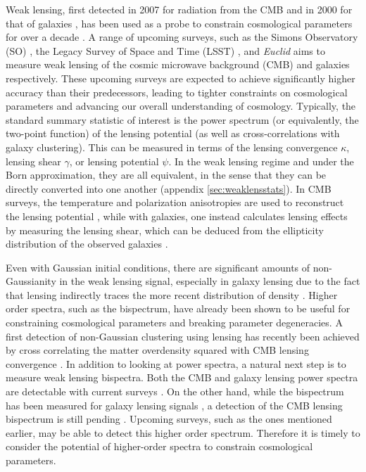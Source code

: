 \documentclass[11pt]{article} %
\begin{document}
Weak lensing, first detected in 2007 for radiation from the CMB \cite{Smith2007} and in 2000 for that of galaxies \cite{Bacon2000, Kaiser2000, Wittman_2000, vanwaerbeke2000detectioncorrelatedgalaxyellipticities}, has been used as a probe to constrain cosmological parameters for over a decade \cite{kilbinger2015cosmology, Waerbeke2000,Bartelmann2001,Planck2018Lensing}. A range of upcoming surveys, such as the Simons Observatory (SO) \cite{Ade2019}, the Legacy Survey of Space and Time (LSST) \cite{Ivezic2019}, and \textit{Euclid} \cite{Laureijs2011} aims to measure weak lensing of the cosmic microwave background (CMB) and galaxies respectively. These upcoming surveys are expected to achieve significantly higher accuracy than their predecessors, leading to tighter constraints on cosmological parameters and advancing our overall understanding of cosmology. Typically, the standard summary statistic of interest is the power spectrum (or equivalently, the two-point function) of the lensing potential (as well as cross-correlations with galaxy clustering). This can be measured in terms of the lensing convergence $\kappa$, lensing shear $\gamma$, or lensing potential $\psi$. In the weak lensing regime and under the Born approximation, they are all equivalent, in the sense that they can be directly converted into one another (appendix \ref{sec:weaklensstats}). In CMB surveys, the temperature and polarization anisotropies are used to reconstruct the lensing potential \cite{Hu_2002}, while with galaxies, one instead calculates lensing effects by measuring the lensing shear, which can be deduced from the ellipticity distribution of the observed galaxies \cite{HoekstraJain2008}.

Even with Gaussian initial conditions, there are significant amounts of non-Gaussianity in the weak lensing signal, especially in galaxy lensing due to the fact that lensing indirectly traces the more recent distribution of density \cite{Bernardeau1997,Takada2003}. Higher order spectra, such as the bispectrum, have already been shown to be useful for constraining cosmological parameters and breaking parameter degeneracies. A first detection of non-Gaussian clustering using lensing has recently been achieved by cross correlating the matter overdensity squared with CMB lensing convergence \cite{Farren:2023yna, Harscouet:2025ksm}. In addition to looking at power spectra, a natural next step is to measure weak lensing bispectra. Both the CMB and galaxy lensing power spectra are detectable with current surveys \cite{Das2011, Planck2013Lensing, Planck2015Lensing, Planck2018Lensing}. On the other hand, while the bispectrum has been measured for galaxy lensing signals \cite{Simon_2013}, a detection of the CMB lensing bispectrum is still pending \cite{Kalaja_2023, Namikawa_2016}. Upcoming surveys, such as the ones mentioned earlier, may be able to detect this higher order spectrum. Therefore it is timely to consider the potential of higher-order spectra to constrain cosmological parameters.
\end{document}
